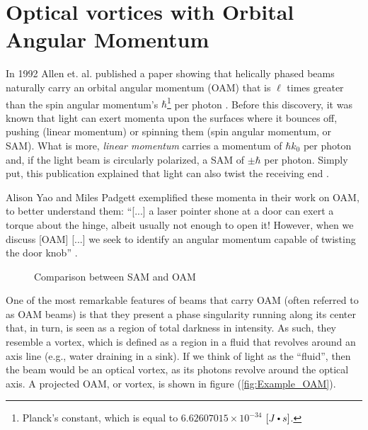 \section{Optical vortices with Orbital Angular Momentum}
\label{c2:OAM}

In 1992 Allen et. al. published a paper showing that helically phased beams naturally carry an orbital angular momentum (OAM) that is $\ell$ times greater than the spin angular momentum's $\hbar$\footnote{Planck's constant, which is equal to $6.62607015\times 10^{-34}$ $[J\bigcdot s]$.} per photon \cite{Allen_OAM:1992}. Before this discovery, it was known that light can exert momenta upon the surfaces where it bounces off, pushing (linear momentum) or spinning them (spin angular momentum, or SAM). What is more, \textit{linear momentum} carries a momentum of $\hbar k_0$ per photon and, if the light beam is circularly polarized, a SAM of $\pm \hbar$ per photon. Simply put, this publication explained that light can also twist the receiving end \cite{Yao-Padgett:2011}.

Alison Yao and Miles Padgett exemplified these momenta in their work on OAM, to better understand them: ``[...] a laser pointer shone at a door can exert a torque about the hinge, albeit usually not enough to open it! However, when we discuss [OAM] [...] we seek to identify an angular momentum capable of twisting the door knob'' \cite{Yao-Padgett:2011-door_example}.

\begin{figure}[htbp]
    \centering
    \caption{Comparison between SAM and OAM \protect\cite{Wikimedia:SAM_vs_OAM}}
    \label{fig:SAM_vs_OAM}
\end{figure}

One of the most remarkable features of beams that carry OAM (often referred to as OAM beams) is that they present a phase singularity running along its center that, in turn, is seen as a region of total darkness in intensity. As such, they resemble a vortex, which is defined as a region in a fluid that revolves around an axis line (e.g., water draining in a sink). If we think of light as the ``fluid'', then the beam would be an optical vortex, as its photons revolve around the optical axis. A projected OAM, or vortex, is shown in figure (\ref{fig:Example_OAM}).


